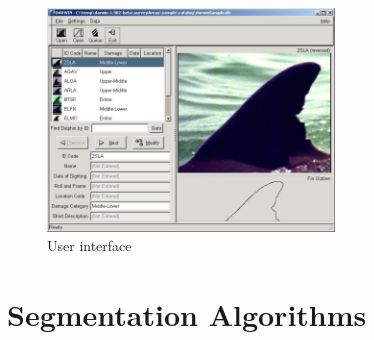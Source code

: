 \documentclass[a4paper,10pt]{article}
\begin{document}
\begin{figure}[H]
 \centering
 \includegraphics[width=3in]{Darwin.jpg}
 \caption{User interface}
\end{figure}

\section{Segmentation Algorithms}
\end{document}
